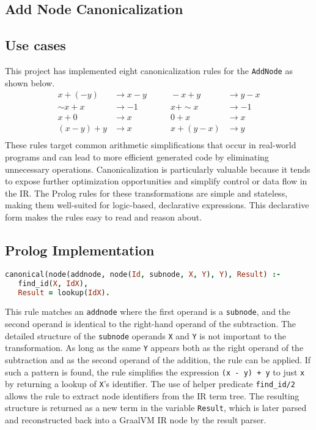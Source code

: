 \subsection{Add Node Canonicalization}
\subsection*{Use cases}
This project has implemented eight canonicalization rules for the \texttt{AddNode} as shown below.
\begin{align*}
    x + (-y)          &\rightarrow x - y        &\qquad -x + y           &\rightarrow y - x \\
    \sim x + x        &\rightarrow -1           &\qquad x + \sim x       &\rightarrow -1     \\
    x + 0             &\rightarrow x            &\qquad 0 + x            &\rightarrow x      \\
    (x - y) + y       &\rightarrow x            &\qquad x + (y - x)      &\rightarrow y      \\
\end{align*}
These rules target common arithmetic simplifications that occur in real-world programs and can lead to more efficient generated code by eliminating unnecessary operations.
Canonicalization is particularly valuable because it tends to expose further optimization opportunities and simplify control or data flow in the IR.
The Prolog rules for these transformations are simple and stateless, making them well-suited for logic-based, declarative expressions.
This declarative form makes the rules easy to read and reason about.

\subsection*{Prolog Implementation}
\newpage
\begin{lstlisting}[language=Prolog]
% (x - y) + y -> x
canonical(node(addnode, node(Id, subnode, X, Y), Y), Result) :-
   find_id(X, IdX),
   Result = lookup(IdX).
\end{lstlisting}
    
This rule matches an \texttt{addnode} where the first operand is a \texttt{subnode}, and the second operand is identical to the right-hand operand of the subtraction.
The detailed structure of the \texttt{subnode} operands \texttt{X} and \texttt{Y} is not important to the transformation. 
As long as the same \texttt{Y} appears both as the right operand of the subtraction and as the second operand of the addition, the rule can be applied. 
If such a pattern is found, the rule simplifies the expression \texttt{(x - y) + y} to just \texttt{x} by returning a lookup of \texttt{X}'s identifier. 
The use of helper predicate \texttt{find\_id/2} allows the rule to extract node identifiers from the IR term tree. 
The resulting structure is returned as a new term in the variable \texttt{Result}, which is later parsed and reconstructed back into a GraalVM IR node by the result parser.

